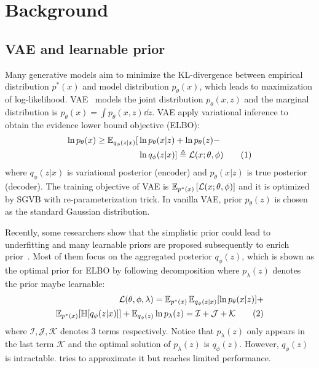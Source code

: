 \section{Background}

\subsection{VAE and learnable prior}

Many generative models aim to minimize the KL-divergence between empirical distribution $p^*(x)$ and model distribution $p_\theta(x)$, which leads to maximization of log-likelihood. VAE~\cite{kingma2014auto} models the joint distribution $p_\theta(x, z)$ and the marginal distribution is $p_\theta(x) = \int p_\theta(x, z) \dd z$. VAE apply variational inference to obtain the evidence lower bound objective (ELBO): 
\begin{align*} \label{eq:ELBO}
\ln p_\theta(x) \geq \operatorname{\mathbb{E}}_{q_\phi(z|x)} [  &  \ln p_\theta(x|z) + \ln p_\theta(z) - \\ & \ln q_\phi(z|x) ] 
\triangleq \mathcal{L}(x; \theta, \phi) \tag{1}
\end{align*}
where $q_\phi(z|x)$ is variational posterior (encoder) and $p_\theta(x|z)$ is true posterior (decoder). The training objective of VAE is $\operatorname{\mathbb{E}}_{{p^*(x)}}\left[{\mathcal{L}(x; \theta, \phi)}\right]$ and it is optimized by SGVB with re-parameterization trick. In vanilla VAE, prior $p_\theta(z)$ is chosen as the standard Gaussian distribution. 

Recently, some researchers show that the simplistic prior could lead to underfitting and many learnable priors are proposed subsequently to enrich prior~\cite{tomczak2018vae}. Most of them focus on the aggregated posterior $q_\phi(z)$, which is shown as the optimal prior for ELBO by following decomposition where $p_\lambda(z)$ denotes the prior maybe learnable:
\begin{align*} \label{eq:second-decomposition}
\mathcal{L}(\theta, \phi, \lambda) = \operatorname{\mathbb{E}}_{p^*(x)}\operatorname{\mathbb{E}}_{q_\phi(z|x)} [ \ln p_\theta(x|z)] + \\ 
\operatorname{\mathbb{E}}_{p^*(x)}[\mathbb{H}[q_\phi(z|x)]] + \operatorname{\mathbb{E}}_{q_\phi(z)} \ln p_\lambda(z) = \mathcal{I} + \mathcal{J} + \mathcal{K} \tag{2}
\end{align*}
where $\mathcal{I}, \mathcal{J}, \mathcal{K}$ denotes 3 terms respectively. 
Notice that $p_\lambda(z)$ only appears in the last term $\mathcal{K}$ and the optimal solution of $p_\lambda(z)$ is $q_\phi(z)$. However, $q_\phi(z)$ is intractable. \cite{tomczak2018vae,takahashi2019variational} tries to approximate it but reaches limited performance. 

